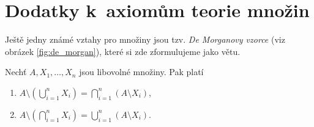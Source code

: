 \chapter{Dodatky k~axiomům teorie množin}\label{chap:dodatky_k_axiomum_tm}
Ještě jedny známé vztahy pro množiny jsou tzv. \emph{De Morganovy vzorce} (viz obrázek \ref{fig:de_morgan}), které si zde zformulujeme jako větu.
\begin{theorem}
    Nechť $A,X_1,\dots,X_n$ jsou libovolné množiny. Pak platí
    \begin{enumerate}[label=(\roman*)]
        \item\label{item:de_morgan_1} $\displaystyle A \setminus \left(\bigcup\limits_{i=1}^{n}{X_i}\right)=\bigcap\limits_{i=1}^{n}{(A \setminus X_i)}$,
        \item\label{item:de_morgan_2} $\displaystyle A \setminus \left(\bigcap\limits_{i=1}^{n}{X_i}\right)=\bigcup\limits_{i=1}^{n}{(A \setminus X_i)}$.
    \end{enumerate}
\end{theorem}

